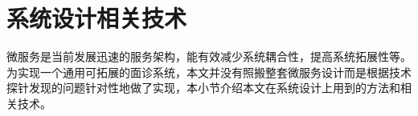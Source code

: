 


%
%
%
%
%

\section{系统设计相关技术}
微服务是当前发展迅速的服务架构\cite{jamshidi2018microservices}，能有效减少系统耦合性，提高系统拓展性等。
为实现一个通用可拓展的面诊系统，本文并没有照搬整套微服务设计而是根据技术探针发现的问题针对性地做了实现，本小节介绍本文在系统设计上用到的方法和相关技术。

